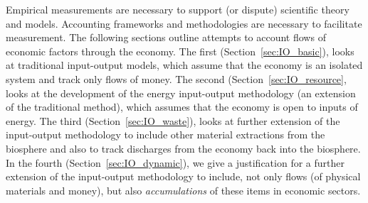 Empirical measurements are necessary to support
(or dispute) scientific theory and models.
Accounting frameworks and methodologies are necessary
to facilitate measurement.
The following sections outline attempts to
account flows of economic factors through the
economy. 
The first (Section~\ref{sec:IO_basic}),
looks at traditional input-output models, 
which assume that the economy is an isolated system 
and track only flows of money.
The second (Section~\ref{sec:IO_resource},
looks at the development of the energy input-output methodology
(an extension of the traditional method),
which assumes that the economy is open to inputs of energy.
The third (Section~\ref{sec:IO_waste}),
looks at further extension of the input-output methodology
to include other material extractions from the biosphere and also
to track discharges from the economy back into the biosphere.
In the fourth (Section~\ref{sec:IO_dynamic}),
we give a justification for a further extension of the input-output
methodology to include,
not only flows (of physical materials and money),
but also \emph{accumulations} of these items
in economic sectors.
%
%
%
%
%
%



